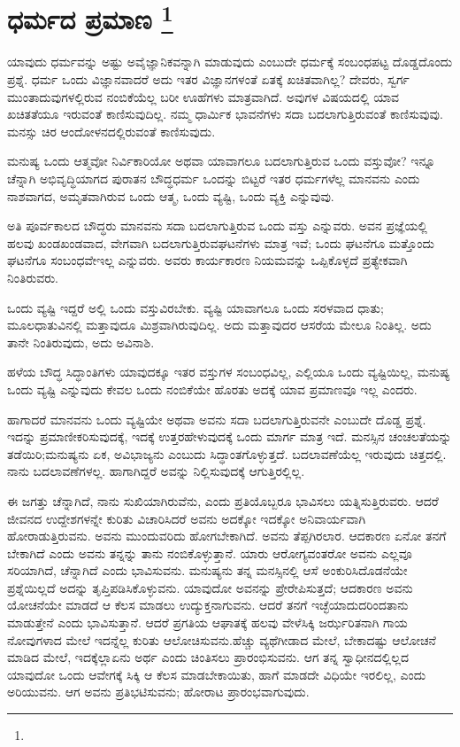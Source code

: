 
\vspace{-0.4cm}

\chapter[ಧರ್ಮದ ಪ್ರಮಾಣ ]{ಧರ್ಮದ ಪ್ರಮಾಣ \protect\footnote{}}

ಯಾವುದು ಧರ್ಮವನ್ನು ಅಷ್ಟು ಅವೈಜ್ಞಾನಿಕವನ್ನಾಗಿ ಮಾಡುವುದು ಎಂಬುದೇ ಧರ್ಮಕ್ಕೆ ಸಂಬಂಧಪಟ್ಟ ದೊಡ್ಡದೊಂದು ಪ್ರಶ್ನೆ. ಧರ್ಮ ಒಂದು ವಿಜ್ಞಾನವಾದರೆ ಅದು ಇತರ ವಿಜ್ಞಾನಗಳಂತೆ ಏತಕ್ಕೆ ಖಚಿತವಾಗಿಲ್ಲ? ದೇವರು, ಸ್ವರ್ಗ ಮುಂತಾದುವುಗಳಲ್ಲಿರುವ ನಂಬಿಕೆಯೆಲ್ಲ ಬರೀ ಊಹೆಗಳು ಮಾತ್ರವಾಗಿದೆ. ಅವುಗಳ ವಿಷಯದಲ್ಲಿ ಯಾವ ಖಚಿತತೆಯೂ ಇರುವಂತೆ ಕಾಣಿಸುವುದಿಲ್ಲ. ನಮ್ಮ ಧಾರ್ಮಿಕ ಭಾವನೆಗಳು ಸದಾ ಬದಲಾಗುತ್ತಿರುವಂತೆ ಕಾಣಿಸುವುವು. ಮನಸ್ಸು ಚಿರ ಆಂದೋಳನದಲ್ಲಿರುವಂತೆ ಕಾಣಿಸುವುದು.

ಮನುಷ್ಯ ಒಂದು ಆತ್ಮವೋ ನಿರ್ವಿಕಾರಿಯೋ ಅಥವಾ ಯಾವಾಗಲೂ ಬದಲಾಗುತ್ತಿರುವ ಒಂದು ವಸ್ತುವೋ? ಇನ್ನೂ ಚೆನ್ನಾಗಿ ಅಭಿವೃದ್ಧಿಯಾಗದ ಪುರಾತನ ಬೌದ್ಧಧರ್ಮ ಒಂದನ್ನು ಬಿಟ್ಟರೆ ಇತರ ಧರ್ಮಗಳೆಲ್ಲ ಮಾನವನು ಎಂದು ನಾಶವಾಗದ, ಅಮೃತವಾಗಿರುವ ಒಂದು ಆತ್ಮ, ಒಂದು ವ್ಯಷ್ಟಿ, ಒಂದು ವ್ಯಕ್ತಿ ಎನ್ನುವುವು.

ಅತಿ ಪೂರ್ವಕಾಲದ ಬೌದ್ಧರು ಮಾನವನು ಸದಾ ಬದಲಾಗುತ್ತಿರುವ ಒಂದು ವಸ್ತು ಎನ್ನುವರು. ಅವನ ಪ್ರಜ್ಞೆಯಲ್ಲಿ ಹಲವು ಖಂಡಖಂಡವಾದ, ವೇಗವಾಗಿ ಬದಲಾಗುತ್ತಿರುವ\break ಘಟನೆಗಳು ಮಾತ್ರ ಇವೆ; ಒಂದು ಘಟನೆಗೂ ಮತ್ತೊಂದು ಘಟನೆಗೂ ಸಂಬಂಧವೇ\break ಇಲ್ಲ ಎನ್ನುವರು. ಅವರು ಕಾರ್ಯಕಾರಣ ನಿಯಮವನ್ನು ಒಪ್ಪಿಕೊಳ್ಳದೆ ಪ್ರತ್ಯೇಕವಾಗಿ ನಿಂತಿರುವರು.

ಒಂದು ವ್ಯಷ್ಟಿ ಇದ್ದರೆ ಅಲ್ಲಿ ಒಂದು ವಸ್ತುವಿರಬೇಕು. ವ್ಯಷ್ಟಿ ಯಾವಾಗಲೂ ಒಂದು ಸರಳವಾದ ಧಾತು; ಮೂಲಧಾತುವಿನಲ್ಲಿ ಮತ್ತಾವುದೂ ಮಿಶ್ರವಾಗಿರುವುದಿಲ್ಲ. ಅದು ಮತ್ತಾವುದರ ಆಸರೆಯ ಮೇಲೂ ನಿಂತಿಲ್ಲ. ಅದು ತಾನೇ ನಿಂತಿರುವುದು, ಅದು ಅವಿನಾಶಿ.

ಹಳೆಯ ಬೌದ್ಧ ಸಿದ್ಧಾಂತಿಗಳು ಯಾವುದಕ್ಕೂ ಇತರ ವಸ್ತುಗಳ ಸಂಬಂಧವಿಲ್ಲ, ಎಲ್ಲಿಯೂ ಒಂದು ವ್ಯಷ್ಟಿಯಿಲ್ಲ, ಮನುಷ್ಯ ಒಂದು ವ್ಯಷ್ಟಿ ಎನ್ನುವುದು ಕೇವಲ ಒಂದು ನಂಬಿಕೆಯೇ ಹೊರತು ಅದಕ್ಕೆ ಯಾವ ಪ್ರಮಾಣವೂ ಇಲ್ಲ ಎಂದರು.

ಹಾಗಾದರೆ ಮಾನವನು ಒಂದು ವ್ಯಷ್ಟಿಯೇ ಅಥವಾ ಅವನು ಸದಾ ಬದಲಾಗು\-ತ್ತಿರುವನೇ ಎಂಬುದೇ ದೊಡ್ಡ ಪ್ರಶ್ನೆ. ಇದನ್ನು ಪ್ರಮಾಣೀಕರಿಸುವುದಕ್ಕೆ, ಇದಕ್ಕೆ ಉತ್ತರ\break ಹೇಳುವುದಕ್ಕೆ ಒಂದು ಮಾರ್ಗ ಮಾತ್ರ ಇದೆ. ಮನಸ್ಸಿನ ಚಂಚಲತೆಯನ್ನು ತಡೆಯಿರಿ;\break ಮನುಷ್ಯನು ಏಕ, ಅವಿಭಾಜ್ಯನು ಎಂಬುದು ಸಿದ್ಧಾಂತಗೊಳ್ಳುತ್ತದೆ. ಬದಲಾವಣೆಯೆಲ್ಲ ಇರುವುದು ಚಿತ್ತದಲ್ಲಿ. ನಾನು ಬದಲಾವಣೆಗಳಲ್ಲ. ಹಾಗಾಗಿದ್ದರೆ ಅವನ್ನು ನಿಲ್ಲಿಸುವುದಕ್ಕೆ ಆಗುತ್ತಿರಲ್ಲಿಲ್ಲ.

ಈ ಜಗತ್ತು ಚೆನ್ನಾಗಿದೆ, ನಾನು ಸುಖಿಯಾಗಿರುವೆನು, ಎಂದು ಪ್ರತಿಯೊಬ್ಬರೂ ಭಾವಿಸಲು ಯತ್ನಿಸುತ್ತಿರುವರು. ಆದರೆ ಜೀವನದ ಉದ್ದೇಶಗಳನ್ನೇ ಕುರಿತು ವಿಚಾರಿಸಿದರೆ ಅವನು ಅದಕ್ಕೋ ಇದಕ್ಕೋ ಅನಿವಾರ್ಯವಾಗಿ ಹೋರಾಡುತ್ತಿರುವನು. ಅವನು ಮುಂದುವರಿದು ಹೋಗಬೇಕಾಗಿದೆ. ಅವನು ತೆಪ್ಪಗಿರಲಾರ. ಆದಕಾರಣ ಏನೋ ತನಗೆ ಬೇಕಾಗಿದೆ ಎಂದು ಅವನು ತನ್ನನ್ನು ತಾನು ನಂಬಿಕೊಳ್ಳುತ್ತಾನೆ. ಯಾರು ಆರೋಗ್ಯವಂತರೋ ಅವನು ಎಲ್ಲವೂ ಸರಿಯಾಗಿದೆ, ಚೆನ್ನಾಗಿದೆ ಎಂದು ಭಾವಿಸುವನು. ಮನುಷ್ಯನು ತನ್ನ ಮನಸ್ಸಿನಲ್ಲಿ ಆಸೆ ಅಂಕುರಿಸಿದೊಡನೆಯೇ ಪ್ರಶ್ನೆಯಿಲ್ಲದೆ ಅದನ್ನು ತೃಪ್ತಿಪಡಿಸಿಕೊಳ್ಳುವನು. ಯಾವುದೋ ಅವನನ್ನು ಪ್ರೇರೇಪಿಸುತ್ತದೆ; ಆದಕಾರಣ ಅವನು ಯೋಚನೆಯೇ ಮಾಡದೆ ಆ ಕೆಲಸ ಮಾಡಲು ಉದ್ಯುಕ್ತನಾಗುವನು. ಆದರೆ ತನಗೆ ಇಚ್ಛೆಯಾದುದರಿಂದ\break ತಾನು ಮಾಡುತ್ತೇನೆ ಎಂದು ಭಾವಿಸುತ್ತಾನೆ. ಆದರೆ ಪ್ರಗತಿಯ ಆಘಾತಕ್ಕೆ ಹಲವು ವೇಳೆ\break ಸಿಕ್ಕಿ ಜರ್ಝರಿತನಾಗಿ ಗಾಯ ನೋವುಗಳಾದ ಮೇಲೆ ಇದನ್ನೆಲ್ಲ ಕುರಿತು ಆಲೋಚಿಸುವನು.\break ಹೆಚ್ಚು ವ್ಯಥೆಗೀಡಾದ ಮೇಲೆ, ಬೇಕಾದಷ್ಟು ಆಲೋಚನೆ ಮಾಡಿದ ಮೇಲೆ, ಇದಕ್ಕೆಲ್ಲಾ\break ಏನು ಅರ್ಥ ಎಂದು ಚಿಂತಿಸಲು ಪ್ರಾರಂಭಿಸುವನು. ಆಗ ತನ್ನ ಸ್ವಾಧೀನದಲ್ಲಿಲ್ಲದ ಯಾವುದೋ ಒಂದು ಆವೇಗಕ್ಕೆ ಸಿಕ್ಕಿ ಆ ಕೆಲಸ ಮಾಡಬೇಕಾಯಿತು, ಹಾಗೆ ಮಾಡದೇ ವಿಧಿಯೇ ಇರಲಿಲ್ಲ, ಎಂದು ಅರಿಯುವನು. ಆಗ ಅವನು ಪ್ರತಿಭಟಿಸುವನು; ಹೋರಾಟ ಪ್ರಾರಂಭವಾಗುವುದು.

